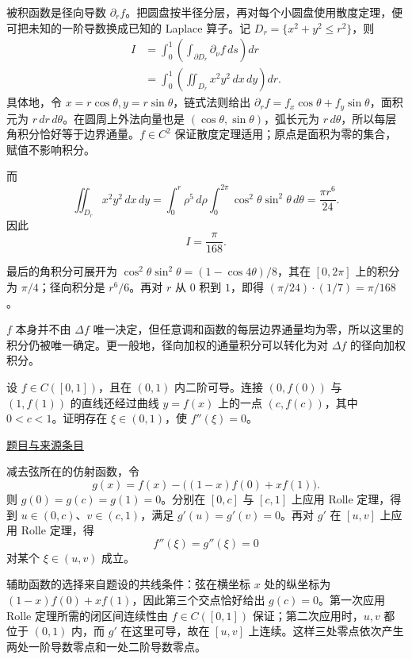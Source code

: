 \documentclass[12pt,fontset=fandol]{ctexart}
\begin{document}
\begin{solve}\label{ans:pre01-math:6}

被积函数是径向导数 $\partial_r f$。把圆盘按半径分层，再对每个小圆盘使用散度定理，便可把未知的一阶导数换成已知的 Laplace 算子。记 $D_r=\{x^2+y^2\le r^2\}$，则
\[
\begin{aligned}
I
&=\int_0^1\left(\int_{\partial D_r}\partial_\nu f\,ds\right)dr\\
&=\int_0^1\left(\iint_{D_r}x^2y^2\,dx\,dy\right)dr.
\end{aligned}
\]
具体地，令 $x=r\cos\theta,y=r\sin\theta$，链式法则给出 $\partial_r f=f_x\cos\theta+f_y\sin\theta$，面积元为 $r\,dr\,d\theta$。在圆周上外法向量也是 $(\cos\theta,\sin\theta)$，弧长元为 $r\,d\theta$，所以每层角积分恰好等于边界通量。$f\in C^2$ 保证散度定理适用；原点是面积为零的集合，赋值不影响积分。

而
\[
\iint_{D_r}x^2y^2\,dx\,dy
=\int_0^r\rho^5\,d\rho
\int_0^{2\pi}\cos^2\theta\sin^2\theta\,d\theta
=\frac{\pi r^6}{24}.
\]
因此
\[
\boxed{I=\frac\pi{168}.}
\]

最后的角积分可展开为 $\cos^2\theta\sin^2\theta=(1-\cos4\theta)/8$，其在 $[0,2\pi]$ 上的积分为 $\pi/4$；径向积分是 $r^6/6$。再对 $r$ 从 $0$ 积到 $1$，即得 $(\pi/24)\cdot(1/7)=\pi/168$。

\end{solve}

\begin{remark}[方法与条件]$f$ 本身并不由 $\Delta f$ 唯一决定，但任意调和函数的每层边界通量均为零，所以这里的积分仍被唯一确定。更一般地，径向加权的通量积分可以转化为对 $\Delta f$ 的径向加权积分。\end{remark}

\begin{example}[来源序号7]\label{ex:pre01-math:7}\label{pr:pre01-math:7}

设 $f\in C([0,1])$，且在 $(0,1)$ 内二阶可导。连接 $(0,f(0))$ 与 $(1,f(1))$ 的直线还经过曲线 $y=f(x)$ 上的一点 $(c,f(c))$，其中 $0<c<1$。证明存在 $\xi\in(0,1)$，使 $f''(\xi)=0$。

\par\href{https://github.com/lzxcr/cmc-mathematics/blob/64916fa1fdbc3e444a652eca204d5669058ee321/src/problems/preliminary/01/07.md}{题目与来源条目}

\end{example}

\begin{solve}\label{ans:pre01-math:7}

减去弦所在的仿射函数，令
\[
g(x)=f(x)-\bigl((1-x)f(0)+xf(1)\bigr).
\]
则 $g(0)=g(c)=g(1)=0$。分别在 $[0,c]$ 与 $[c,1]$ 上应用 Rolle 定理，得到 $u\in(0,c)$、$v\in(c,1)$，满足 $g'(u)=g'(v)=0$。再对 $g'$ 在 $[u,v]$ 上应用 Rolle 定理，得
\[
f''(\xi)=g''(\xi)=0
\]
对某个 $\xi\in(u,v)$ 成立。

辅助函数的选择来自题设的共线条件：弦在横坐标 $x$ 处的纵坐标为 $(1-x)f(0)+xf(1)$，因此第三个交点恰好给出 $g(c)=0$。第一次应用 Rolle 定理所需的闭区间连续性由 $f\in C([0,1])$ 保证；第二次应用时，$u,v$ 都位于 $(0,1)$ 内，而 $g'$ 在这里可导，故在 $[u,v]$ 上连续。这样三处零点依次产生两处一阶导数零点和一处二阶导数零点。

\end{solve}
\end{document}
